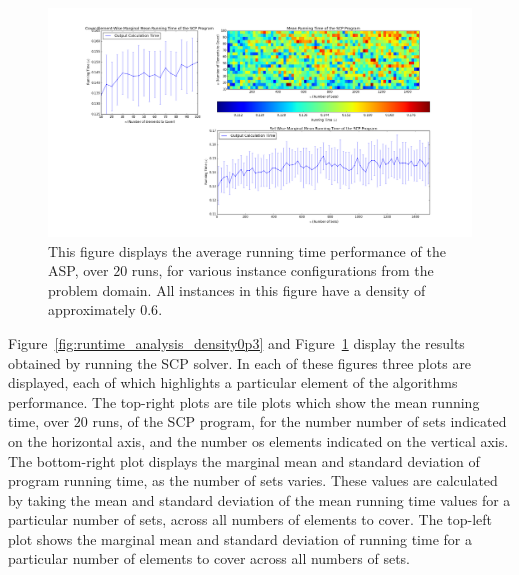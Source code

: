 \documentclass[12pt]{article}
\begin{document}
\begin{figure}[ht!] \label{fig:runtime_analysis_density0p6}
	
	
	
	\centering
	\centerline{\includegraphics[width = 6.7in]{running_time_original_density0p6.png}}
	\hfill
	
	\caption{This figure displays the average running time performance of the ASP, over $20$ runs, for various instance configurations from the problem domain. All instances in this figure have a density of approximately $0.6$.}
	
	
\end{figure}

Figure~\ref{fig:runtime_analysis_density0p3} and Figure~\ref{fig:runtime_analysis_density0p6} display the results obtained by running the SCP solver. In each of these figures three plots are displayed, each of which highlights a particular element of the algorithms performance. The top-right plots are tile plots which show the mean running time, over $20$ runs, of the SCP program, for the number number of sets indicated on the horizontal axis, and the number os elements indicated on the vertical axis. The bottom-right plot displays the marginal mean and standard deviation of program running time, as the number of sets varies. These values are calculated by taking the mean and standard deviation of the mean running time values for a particular number of sets, across all numbers of elements to cover. The top-left plot shows the marginal mean and standard deviation of running time for a particular number of elements to cover across all numbers of sets.
\end{document}
